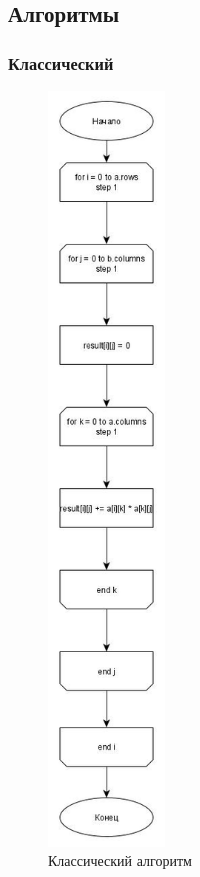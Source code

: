 \documentclass[a4paper, 14pt]{article}
\begin{document}
	\subsection{Алгоритмы}
	
	\subsubsection{Классический}
	
	\vspace{1cm}
	
	\begin{figure}[]
		\centering
		\includegraphics[height=20cm]{Схемы/simple}
		\caption{Классический алгоритм}
		\label{fig:simple}
	\end{figure}
	
\end{document}
